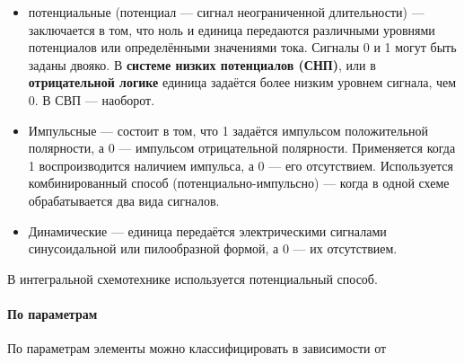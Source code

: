\documentclass[10pt,a4paper,titlepage]{article}
\begin{document}
\begin{itemize}
\item потенциальные (потенциал --- сигнал неограниченной длительности) --- заключается в том, что ноль и единица передаются различными уровнями потенциалов или определёнными значениями тока.
Сигналы 0 и 1 могут быть заданы двояко. В \textbf{системе низких потенциалов (СНП)}, или в \textbf{отрицательной логике} единица задаётся более низким уровнем сигнала, чем 0.
В СВП --- наоборот.
\item Импульсные --- состоит в том, что 1 задаётся импульсом положительной полярности, а 0 --- импульсом отрицательной полярности.
Применяется когда 1 воспроизводится наличием импульса, а 0 --- его отсутствием.
Используется комбинированный способ (потенциально-импульсно) --- когда в одной схеме обрабатывается два вида сигналов.
\item Динамические --- единица передаётся электрическими сигналами синусоидальной или пилообразной формой, а 0 --- их отсутствием.
\end{itemize}

В интегральной схемотехнике используется потенциальный способ.

\paragraph{По параметрам}

По параметрам элементы можно классифицировать в зависимости от
\end{document}

